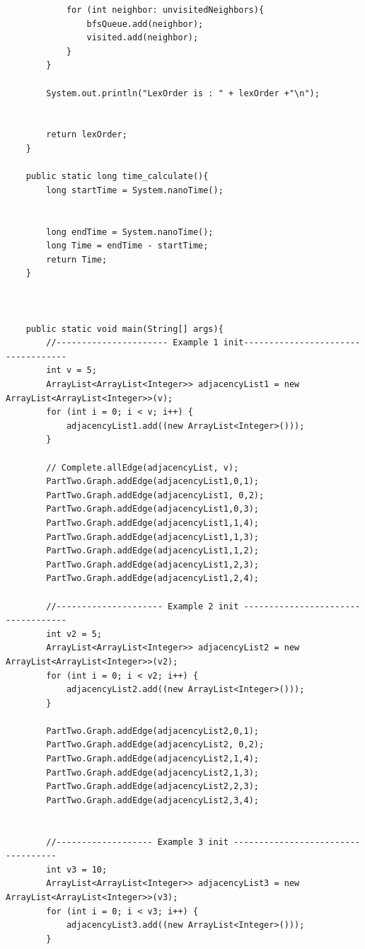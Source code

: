 \documentclass{article}
\begin{document}
\begin{verbatim}
            for (int neighbor: unvisitedNeighbors){
                bfsQueue.add(neighbor);
                visited.add(neighbor);
            }
        }

        System.out.println("LexOrder is : " + lexOrder +"\n");


        return lexOrder;
    }

    public static long time_calculate(){
        long startTime = System.nanoTime();


        long endTime = System.nanoTime();
        long Time = endTime - startTime;
        return Time;
    }



    public static void main(String[] args){
        //---------------------- Example 1 init-----------------------------------
        int v = 5;
        ArrayList<ArrayList<Integer>> adjacencyList1 = new ArrayList<ArrayList<Integer>>(v);
        for (int i = 0; i < v; i++) {
            adjacencyList1.add((new ArrayList<Integer>()));
        }

        // Complete.allEdge(adjacencyList, v);
        PartTwo.Graph.addEdge(adjacencyList1,0,1);
        PartTwo.Graph.addEdge(adjacencyList1, 0,2);
        PartTwo.Graph.addEdge(adjacencyList1,0,3);
        PartTwo.Graph.addEdge(adjacencyList1,1,4);
        PartTwo.Graph.addEdge(adjacencyList1,1,3);
        PartTwo.Graph.addEdge(adjacencyList1,1,2);
        PartTwo.Graph.addEdge(adjacencyList1,2,3);
        PartTwo.Graph.addEdge(adjacencyList1,2,4);

        //--------------------- Example 2 init -----------------------------------
        int v2 = 5;
        ArrayList<ArrayList<Integer>> adjacencyList2 = new ArrayList<ArrayList<Integer>>(v2);
        for (int i = 0; i < v2; i++) {
            adjacencyList2.add((new ArrayList<Integer>()));
        }

        PartTwo.Graph.addEdge(adjacencyList2,0,1);
        PartTwo.Graph.addEdge(adjacencyList2, 0,2);
        PartTwo.Graph.addEdge(adjacencyList2,1,4);
        PartTwo.Graph.addEdge(adjacencyList2,1,3);
        PartTwo.Graph.addEdge(adjacencyList2,2,3);
        PartTwo.Graph.addEdge(adjacencyList2,3,4);


        //------------------- Example 3 init -----------------------------------
        int v3 = 10;
        ArrayList<ArrayList<Integer>> adjacencyList3 = new ArrayList<ArrayList<Integer>>(v3);
        for (int i = 0; i < v3; i++) {
            adjacencyList3.add((new ArrayList<Integer>()));
        }


\end{verbatim}
\end{document}
